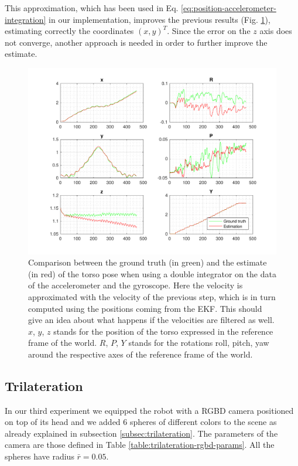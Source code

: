 \documentclass[a4paper]{article}
\begin{document}
This approximation, which has been used in Eq.
\ref{eq:position-accelerometer-integration} in our implementation,
improves the previous results
(Fig. \ref{fig:comp_ground_truth_estimated_torso_accelerometer_prevlinearvelocity}),
estimating correctly the coordinates $(x, y)^T$.
Since the error on the $z$ axis does not converge,
another approach is needed in order to further improve the estimate.
\begin{figure}
    \centering
    \includegraphics[width=\textwidth]{images/accelerometer_prev_linearvelocity}
    \caption{Comparison between the ground truth (in green) and the estimate (in red) of the torso
        pose when using a double integrator on the data of the accelerometer
        and the gyroscope. Here the velocity is approximated with the velocity
        of the previous step, which is in turn computed using the positions
        coming from the EKF. This should give an idea about what happens if the
        velocities are filtered as well. $x$, $y$, $z$ stands for the position
        of the torso expressed in the reference frame of the
        world. $R$, $P$, $Y$ stands for the rotations roll,
        pitch, yaw around the respective axes of the
        reference frame of the world.}
    \label{fig:comp_ground_truth_estimated_torso_accelerometer_prevlinearvelocity}
\end{figure}

\subsection{Trilateration}
In our third experiment we equipped the robot with a RGBD camera positioned
on top of its head and we added 6 spheres of different colors to the scene as
already explained in subsection \ref{subsec:trilateration}. The parameters of
the camera are those defined in Table \ref{table:trilateration-rgbd-params}.
All the spheres
have radius $\bar{r}=0.05$.
\end{document}
